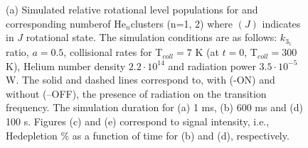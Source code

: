 \begin{figure}[!htb]
\begin{adjustbox}{minipage=\linewidth,scale=0.7}
    \hfill
    \hfill
    
    \end{adjustbox}
    
    \caption{(a) Simulated relative rotational level populations for \CD and corresponding numberof He$_n$\CD clusters (n=1, 2) where \CD$(J)$ indicates \CD in $J$ rotational state. The simulation conditions are as follows: $k_{3_1}$ ratio, $a=0.5$, collisional rates for T$_{coll}=7$ K  (at $t=0$, T$_{coll}=300$ K), Helium number density $2.2 \cdot 10^{14}$ \percc and radiation power $3.5\cdot10^{-5}$ W. The solid and dashed lines correspond to, with (-ON) and without (--OFF), the presence of radiation on the \CD \CDline transition frequency. The simulation duration for (a) 1 ms, (b) 600 ms and (d) 100 s. Figures (c) and (e) correspond to signal intensity, i.e., He\CD depletion \% as a function of time for (b) and (d), respectively.}
    
    \label{fig:thz-sim:rel-pop}

\end{figure}
